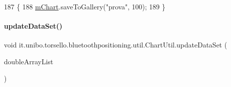 \begin{DoxyCode}
187                                  \{
188         \hyperlink{classit_1_1unibo_1_1torsello_1_1bluetoothpositioning_1_1util_1_1ChartUtil_a60b5bd6796cc5dcde12d9a6bb3e67c86_a60b5bd6796cc5dcde12d9a6bb3e67c86}{mChart}.saveToGallery(\textcolor{stringliteral}{"prova"}, 100);
189     \}
\end{DoxyCode}
\hypertarget{classit_1_1unibo_1_1torsello_1_1bluetoothpositioning_1_1util_1_1ChartUtil_aa9bda04d2c2058fb1b3fcd72c5a7471d_aa9bda04d2c2058fb1b3fcd72c5a7471d}{}\label{classit_1_1unibo_1_1torsello_1_1bluetoothpositioning_1_1util_1_1ChartUtil_aa9bda04d2c2058fb1b3fcd72c5a7471d_aa9bda04d2c2058fb1b3fcd72c5a7471d} 
\paragraph{\texorpdfstring{update\+Data\+Set()}{updateDataSet()}}
{\footnotesize\ttfamily void it.\+unibo.\+torsello.\+bluetoothpositioning.\+util.\+Chart\+Util.\+update\+Data\+Set (\begin{DoxyParamCaption}\item[{final Array\+List$<$ Double $>$}]{double\+Array\+List }\end{DoxyParamCaption})}


